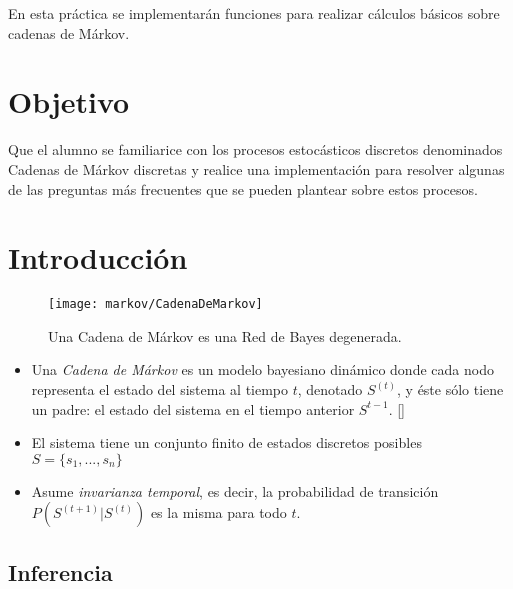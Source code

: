 
En esta práctica se implementarán funciones para realizar cálculos básicos sobre cadenas de Márkov.

\section{Objetivo}

\begin{compactitem}
 \item Que el alumno se familiarice con los procesos estocásticos discretos denominados Cadenas de Márkov discretas y realice una implementación para resolver algunas de las preguntas más frecuentes que se pueden plantear sobre estos procesos.
\end{compactitem}


\section{Introducción}

\begin{figure}
 \centering
 \texttt{[image: markov/CadenaDeMarkov]}
 \caption{Una Cadena de Márkov es una Red de Bayes degenerada.}\label{Fig:CadenaDeMarkov}
\end{figure}

\begin{definition}
 \begin{itemize}
  \item Una \emph{Cadena de Márkov} es un modelo bayesiano dinámico donde cada nodo representa el estado del sistema al tiempo $t$, denotado $S^{(t)}$, y éste sólo tiene un padre: el estado del sistema en el tiempo anterior $S^{t-1}$. []

  \item El sistema tiene un conjunto finito de estados discretos posibles $S = \{s_1,...,s_n\}$

  \item Asume \emph{invarianza temporal}, es decir, la probabilidad de transición $P(S^{(t+1)}|S^{(t)})$ es la misma para todo $t$.
 \end{itemize}
\end{definition}

\subsection{Inferencia}

